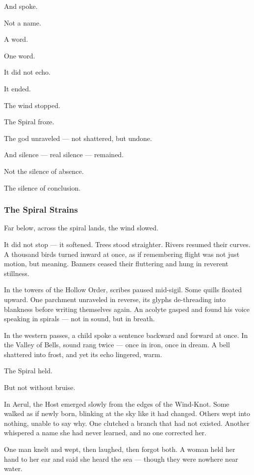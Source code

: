 \documentclass[12pt]{article}
\begin{document}
And spoke.

Not a name.

A word.

One word.

It did not echo.

It ended.

The wind stopped.

The Spiral froze.

The god unraveled — not shattered, but undone.

And silence — real silence — remained.

Not the silence of absence.

The silence of conclusion.

\dotfill

\subsubsection*{The Spiral Strains}

Far below, across the spiral lands, the wind slowed.

It did not stop — it softened. Trees stood straighter. Rivers resumed their curves. A thousand birds turned inward at once, as if remembering flight was not just motion, but meaning. Banners ceased their fluttering and hung in reverent stillness.

In the towers of the Hollow Order, scribes paused mid-sigil. Some quills floated upward. One parchment unraveled in reverse, its glyphs de-threading into blankness before writing themselves again. An acolyte gasped and found his voice speaking in spirals — not in sound, but in breath.

In the western passes, a child spoke a sentence backward and forward at once. In the Valley of Bells, sound rang twice — once in iron, once in dream. A bell shattered into frost, and yet its echo lingered, warm.

The Spiral held.

But not without bruise.

In Aerul, the Host emerged slowly from the edges of the Wind-Knot. Some walked as if newly born, blinking at the sky like it had changed. Others wept into nothing, unable to say why. One clutched a branch that had not existed. Another whispered a name she had never learned, and no one corrected her.

One man knelt and wept, then laughed, then forgot both. A woman held her hand to her ear and said she heard the sea — though they were nowhere near water.
\end{document}
